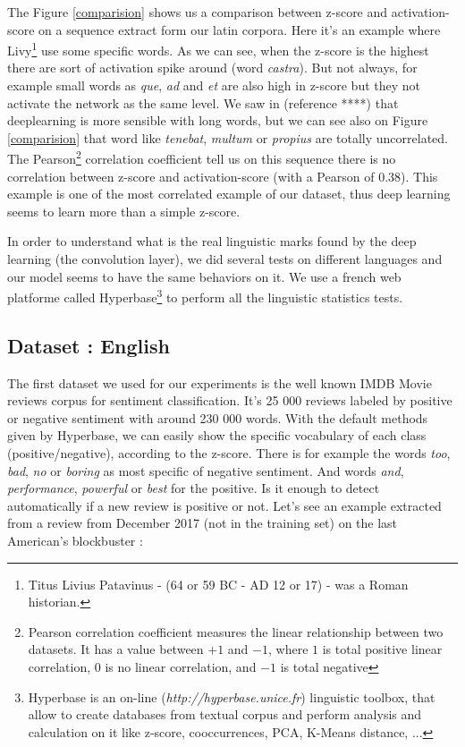 The Figure \ref{comparision} shows us a comparison between z-score and activation-score on a sequence extract form our latin corpora. Here it's an example where Livy\footnote{Titus Livius Patavinus - (64 or 59 BC - AD 12 or 17) -  was a Roman historian.} use some specific words. As we can see, when the z-score is the highest there are sort of activation spike around (word \textit{castra}). But not always, for example small words as \textit{que}, \textit{ad} and \textit{et} are also high in z-score but they not activate the network as the same level. We saw in (reference ****) that deeplearning is more sensible with long words, but we can see also on Figure \ref{comparision} that word like \textit{tenebat}, \textit{multum} or \textit{propius} are totally uncorrelated. The Pearson\footnote{Pearson correlation coefficient measures the linear relationship between two datasets. It has a value between $+1$ and $-1$, where $1$ is total positive linear correlation, $0$ is no linear correlation, and $-1$ is total negative} correlation coefficient tell us on this sequence there is no correlation between z-score and activation-score (with a Pearson of 0.38). This example is one of the most correlated example of our dataset, thus deep learning seems to learn more than a simple z-score.

In order to understand what is the real linguistic marks found by the deep learning (the convolution layer), we did several tests on different languages and our model seems to have the same behaviors on it. We use a french web platforme called Hyperbase\footnote{Hyperbase is an on-line (\textit{http://hyperbase.unice.fr}) linguistic toolbox, that allow to create databases from textual corpus and perform analysis and calculation on it like z-score, cooccurrences, PCA, K-Means distance, ... } to perform all the linguistic statistics tests. 

\subsection{Dataset : English}

The first dataset we used for our experiments is the well known IMDB Movie reviews corpus for sentiment classification. It's 25 000 reviews labeled by positive or negative sentiment with around 230 000 words. With the default methods given by Hyperbase, we can easily show the specific vocabulary of each class (positive/negative), according to the z-score. There is for example the words \textit{too}, \textit{bad}, \textit{no} or \textit{boring} as most specific of negative sentiment. And words \textit{and}, \textit{performance}, \textit{powerful} or \textit{best} for the positive. 
Is it enough to detect automatically if a new review is positive or not. Let's see an example extracted from a review from December 2017 (not in the training set) on the last American's blockbuster :

